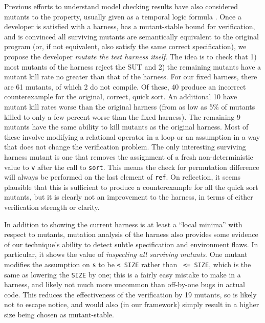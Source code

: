 \documentclass[conference]{IEEEtran}
\begin{document}
Previous efforts to understand model checking results have also
considered mutants to the property, usually given as a temporal logic
formula \cite{MutSpec}.  Once a developer is satisfied with a harness,
has a mutant-stable bound for verification, and is convinced all
surviving mutants are semantically equivalent to the original program
(or, if not equivalent, also satisfy the same correct specification),
we propose the developer \emph{mutate the test harness itself}.  The
idea is to check that 1) most mutants of the harness reject the SUT
and 2) the remaining mutants have a mutant kill rate no greater than
that of the harness.  For our fixed harness, there are 61 mutants, of
which 2 do not compile.  Of these, 40 produce an incorrect
counterexample for the original, correct, quick sort.  An additional
10 have mutant kill rates worse than the original harness (from
as low as 5\% of mutants killed to only a few percent worse than the
fixed harness).  The remaining 9 mutants have the same ability to kill
mutants as the original harness.  Most of these involve modifying a
relational operator in a loop or an assumption in a way that does not
change the verification problem.  The only interesting surviving
harness mutant is one that removes the assignment of a fresh
non-deterministic value to {\tt v} after the call to {\tt sort}.  This
means the check for permutation difference will always be performed on
the last element of {\tt ref}.  On reflection, it seems plausible
that this is sufficient to produce a counterexample for all the quick
sort mutants, but it is clearly not an improvement to the harness, in
terms of either verification strength or clarity.

In addition to showing the current harness is at least a ``local
minima'' with respect to mutants, mutation analysis of the harness
also provides some evidence of our technique's ability to detect
subtle specification and environment flaws.  In particular, it shows
the value of \emph{inspecting all surviving mutants}.  One mutant
modifies the assumption on {\tt s} to be {\tt < SIZE} rather than {\tt
  <= SIZE}, which is the same as lowering the {\tt SIZE} by one; this
is  a fairly easy mistake to make in a harness, and likely not much more
uncommon than off-by-one bugs in actual code.  This
reduces the effectiveness of the verification by 19 mutants, so is
likely not to escape notice, and would also (in our framework) simply
result in a higher size being chosen as mutant-stable.
\end{document}
